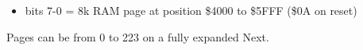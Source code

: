 \begin{itemize}
\item bits 7-0 = 8k RAM page at position \$4000 to \$5FFF (\$0A on
  reset)
\end{itemize}
Pages can be from 0 to 223 on a fully expanded Next.

